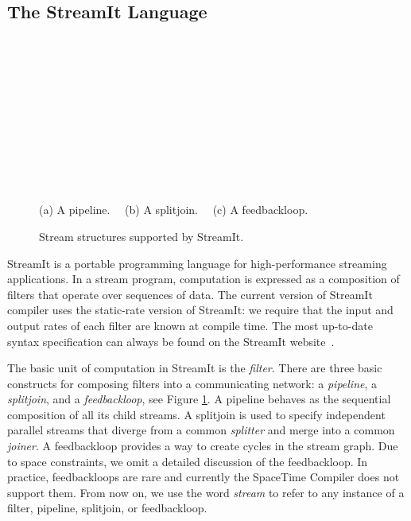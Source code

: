 \subsection{The StreamIt Language}
\label{sec:streamit}
\begin{figure}[t]
\begin{minipage}{3.2in}
\begin{center}
\begin{minipage}{0.46in}
\centering
{} \\
\end{minipage} 
~
\begin{minipage}{1.3in}
\centering
{} \\
\end{minipage}
~
\begin{minipage}{1.02in}
\centering
{} \\
\end{minipage} 
\\ ~ \\ {\protect\small (a) A pipeline. ~~(b) A splitjoin. ~~(c) A feedbackloop.}
\caption{Stream structures supported by StreamIt.
\protect\label{fig:structures}}
\end{center}
\end{minipage}
\end{figure}

StreamIt is a portable programming language for high-performance
streaming applications.  In a stream program, computation is expressed
as a composition of filters that operate over sequences of data. The
current version of StreamIt compiler uses the static-rate version of
StreamIt: we require that the input and output rates of each filter
are known at compile time.  The most up-to-date syntax specification
can always be found on the StreamIt website~\cite{streamitweb}.

The basic unit of computation in StreamIt is the {\it filter}.  There
are three basic constructs for composing filters into a communicating
network: a {\it pipeline}, a {\it splitjoin}, and a {\it
feedbackloop}, see Figure \ref{fig:structures}.  A pipeline behaves as
the sequential composition of all its child streams.  A splitjoin is
used to specify independent parallel streams that diverge from a
common {\it splitter} and merge into a common {\it joiner}. A
feedbackloop provides a way to create cycles in the stream graph.  Due
to space constraints, we omit a detailed discussion of the
feedbackloop. In practice, feedbackloops are rare and currently the
SpaceTime Compiler does not support them. From now on, we use the word
{\it stream} to refer to any instance of a filter, pipeline,
splitjoin, or feedbackloop.



